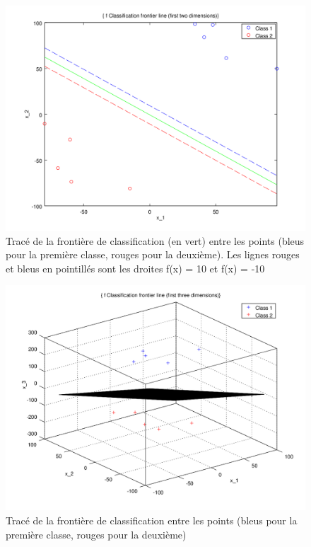 \documentclass{article}
\begin{document}
         \begin{figure}
           \begin{center}
             \subfigure\includegraphics[scale=0.5]{images/line1.png}
             \caption{Tracé de la frontière de classification (en vert) entre les points (bleus pour la première classe, rouges pour la deuxième). Les lignes rouges et bleus en pointillés sont les droites f(x) = 10 et f(x) = -10}
           \end{center}
         \end{figure}

         \begin{figure}
           \begin{center}
             \subfigure\includegraphics[scale=0.5]{images/plane1.png}
             \caption{Tracé de la frontière de classification entre les points (bleus pour la première classe, rouges pour la deuxième)}
           \end{center}
         \end{figure}
\end{document}
